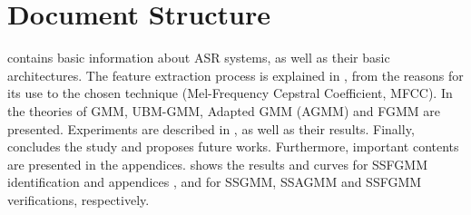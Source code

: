 \section{Document Structure}

 contains basic information about ASR systems, as well as their basic architectures. The feature extraction process is explained in , from the reasons for its use to the chosen technique (Mel-Frequency Cepstral Coefficient, MFCC). In  the theories of GMM, UBM-GMM, Adapted GMM (AGMM) and FGMM are presented. Experiments are described in , as well as their results. Finally,  concludes the study and proposes future works. Furthermore, important contents are presented in the appendices.  shows the results and curves for SSFGMM identification and appendices ,  and  for SSGMM, SSAGMM and SSFGMM verifications, respectively.